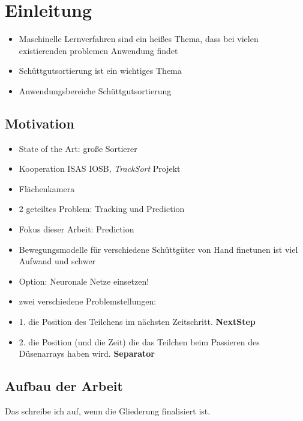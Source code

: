 \chapter{Einleitung}

\begin{itemize}
    \item Maschinelle Lernverfahren sind ein heißes Thema, dass bei vielen existierenden problemen Anwendung findet
    \item Schüttgutsortierung ist ein wichtiges Thema 
    \item Anwendungsbereiche Schüttgutsortierung
    
\end{itemize}


\section{Motivation}

\begin{itemize}
    \item State of the Art: große Sortierer
    \item Kooperation ISAS IOSB, \textit{TrackSort} Projekt 
    \item Flächenkamera
    \item 2 geteiltes Problem: Tracking und Prediction
    \item Fokus dieser Arbeit: Prediction
    \item Bewegungsmodelle für verschiedene Schüttgüter von Hand finetunen ist viel Aufwand und schwer
    \item Option: Neuronale Netze einsetzen! 
    \item zwei verschiedene Problemstellungen:
    \item 1. die Position des Teilchens im nächsten Zeitschritt. \textbf{NextStep}
    \item 2. die Position (und die Zeit) die das Teilchen beim Passieren des Düsenarrays haben wird. \textbf{Separator}
\end{itemize}


\section{Aufbau der Arbeit}

Das schreibe ich auf, wenn die Gliederung finalisiert ist.



